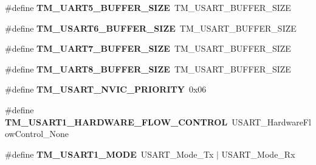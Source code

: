 \begin{DoxyCompactItemize}
\item 
\hypertarget{group___t_m___u_s_a_r_t___macros_ga0ebb096752930479ef58785fd275a6a1}{}\#define {\bfseries T\+M\+\_\+\+U\+A\+R\+T5\+\_\+\+B\+U\+F\+F\+E\+R\+\_\+\+S\+I\+Z\+E}~T\+M\+\_\+\+U\+S\+A\+R\+T\+\_\+\+B\+U\+F\+F\+E\+R\+\_\+\+S\+I\+Z\+E\label{group___t_m___u_s_a_r_t___macros_ga0ebb096752930479ef58785fd275a6a1}

\item 
\hypertarget{group___t_m___u_s_a_r_t___macros_ga2dde554a075683be3b7f3cd8585164fd}{}\#define {\bfseries T\+M\+\_\+\+U\+S\+A\+R\+T6\+\_\+\+B\+U\+F\+F\+E\+R\+\_\+\+S\+I\+Z\+E}~T\+M\+\_\+\+U\+S\+A\+R\+T\+\_\+\+B\+U\+F\+F\+E\+R\+\_\+\+S\+I\+Z\+E\label{group___t_m___u_s_a_r_t___macros_ga2dde554a075683be3b7f3cd8585164fd}

\item 
\hypertarget{group___t_m___u_s_a_r_t___macros_ga372f26f3ec9e129b2ea80166d18e54c7}{}\#define {\bfseries T\+M\+\_\+\+U\+A\+R\+T7\+\_\+\+B\+U\+F\+F\+E\+R\+\_\+\+S\+I\+Z\+E}~T\+M\+\_\+\+U\+S\+A\+R\+T\+\_\+\+B\+U\+F\+F\+E\+R\+\_\+\+S\+I\+Z\+E\label{group___t_m___u_s_a_r_t___macros_ga372f26f3ec9e129b2ea80166d18e54c7}

\item 
\hypertarget{group___t_m___u_s_a_r_t___macros_ga9759f375f97bd993f479d66074ef3898}{}\#define {\bfseries T\+M\+\_\+\+U\+A\+R\+T8\+\_\+\+B\+U\+F\+F\+E\+R\+\_\+\+S\+I\+Z\+E}~T\+M\+\_\+\+U\+S\+A\+R\+T\+\_\+\+B\+U\+F\+F\+E\+R\+\_\+\+S\+I\+Z\+E\label{group___t_m___u_s_a_r_t___macros_ga9759f375f97bd993f479d66074ef3898}

\item 
\hypertarget{group___t_m___u_s_a_r_t___macros_ga755945ded748d88cf4aa74065ddc4c2f}{}\#define {\bfseries T\+M\+\_\+\+U\+S\+A\+R\+T\+\_\+\+N\+V\+I\+C\+\_\+\+P\+R\+I\+O\+R\+I\+T\+Y}~0x06\label{group___t_m___u_s_a_r_t___macros_ga755945ded748d88cf4aa74065ddc4c2f}

\item 
\hypertarget{group___t_m___u_s_a_r_t___macros_ga0f1d22ebda9b2c513d16001178fb1739}{}\#define {\bfseries T\+M\+\_\+\+U\+S\+A\+R\+T1\+\_\+\+H\+A\+R\+D\+W\+A\+R\+E\+\_\+\+F\+L\+O\+W\+\_\+\+C\+O\+N\+T\+R\+O\+L}~U\+S\+A\+R\+T\+\_\+\+Hardware\+Flow\+Control\+\_\+\+None\label{group___t_m___u_s_a_r_t___macros_ga0f1d22ebda9b2c513d16001178fb1739}

\item 
\hypertarget{group___t_m___u_s_a_r_t___macros_ga65e2e2b15d1b130bfa01638b32d1f0cc}{}\#define {\bfseries T\+M\+\_\+\+U\+S\+A\+R\+T1\+\_\+\+M\+O\+D\+E}~U\+S\+A\+R\+T\+\_\+\+Mode\+\_\+\+Tx $\vert$ U\+S\+A\+R\+T\+\_\+\+Mode\+\_\+\+Rx\label{group___t_m___u_s_a_r_t___macros_ga65e2e2b15d1b130bfa01638b32d1f0cc}


\end{DoxyCompactItemize}
